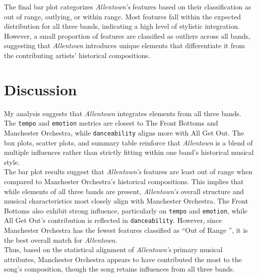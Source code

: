 \documentclass{article}\usepackage[]{graphicx}\usepackage[]{xcolor}
\begin{document}
\begin{multicols}{2}
\noindent The final bar plot categorizes \textit{Allentown's} features based on their classification as out of range, outlying, or within range. Most features fall within the expected distribution for all three bands, indicating a high level of stylistic integration. However, a small proportion of features are classified as outliers across all bands, suggesting that \textit{Allentown} introduces unique elements that differentiate it from the contributing artists' historical compositions.

\section{Discussion}

My analysis suggests that \textit{Allentown} integrates elements from all three bands. The \texttt{tempo} and \texttt{emotion} metrics are closest to The Front Bottoms and Manchester Orchestra, while \texttt{danceability} aligns more with All Get Out. The box plots, scatter plots, and summary table reinforce that \textit{Allentown} is a blend of multiple influences rather than strictly fitting within one band's historical musical style.\\

\noindent The bar plot results suggest that \textit{Allentown's} features are least out of range when compared to Manchester Orchestra's historical compositions. This implies that while elements of all three bands are present, \textit{Allentown's} overall structure and musical characteristics most closely align with Manchester Orchestra. The Front Bottoms also exhibit strong influence, particularly on \texttt{tempo} and \texttt{emotion}, while All Get Out's contribution is reflected in \texttt{danceability}. However, since Manchester Orchestra has the fewest features classified as \textquotedblleft Out of Range \textquotedblright, it is the best overall match for \textit{Allentown}. \\

\noindent Thus, based on the statistical alignment of \textit{Allentown's} primary musical attributes, Manchester Orchestra appears to have contributed the most to the song's composition, though the song retains influences from all three bands.


\end{multicols}
\end{document}
